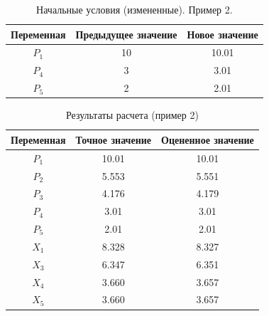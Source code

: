 \begin{table}[h!]
  \centering
    \begin{tabular}{| c | c | c |}
    \hline
    Переменная & Предыдущее значение & Новое значение \\ \hline
    $ P_1 $ & 10 & 10.01 \\ \hline
    $ P_4 $ & 3 & 3.01 \\ \hline
    $ P_5 $ & 2 & 2.01 \\ \hline

    \end{tabular}
  \caption{Начальные условия (измененные). Пример 2.}
\end{table}

\begin{table}[h!]
  \centering
    \begin{tabular}{| c | c | c |}
    \hline
    Переменная & Точное значение & Оцененное значение \\ \hline
    $ P_1 $ & 10.01 & 10.01 \\ \hline
    $ P_2 $ & 5.553 & 5.551 \\ \hline
    $ P_3 $ & 4.176 & 4.179 \\ \hline
    $ P_4 $ & 3.01 & 3.01 \\ \hline
    $ P_5 $ & 2.01 & 2.01 \\ \hline
    $ X_1 $ & 8.328 & 8.327 \\ \hline
    $ X_3 $ & 6.347 & 6.351 \\ \hline
    $ X_4 $ & 3.660 & 3.657 \\ \hline
    $ X_5 $ & 3.660 & 3.657 \\ \hline

    \end{tabular}
  \caption{Результаты расчета (пример 2)}
\end{table}